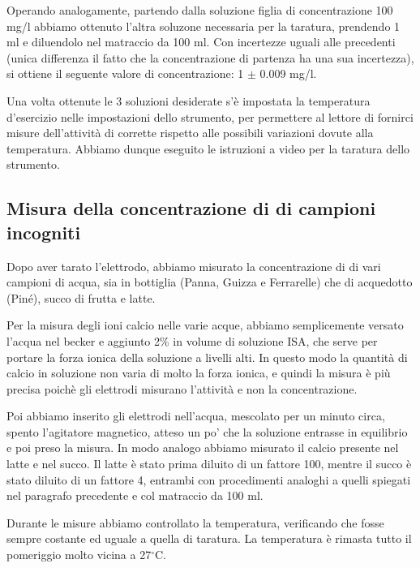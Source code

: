 Operando analogamente, partendo dalla soluzione figlia di concentrazione 100 mg/l abbiamo ottenuto l'altra soluzone
necessaria per la taratura, prendendo 1 ml e diluendolo nel matraccio da 100 ml. Con incertezze uguali alle precedenti (unica differenza il fatto che la concentrazione di partenza ha una sua incertezza), si ottiene il seguente
valore di concentrazione: 1 $\pm$ 0.009 mg/l.

Una volta ottenute le 3 soluzioni desiderate s'è impostata la temperatura d'esercizio nelle impostazioni
dello strumento, per permettere al lettore di fornirci misure dell'attività di 
corrette rispetto alle possibili variazioni dovute alla temperatura. Abbiamo dunque eseguito le istruzioni a video
per la taratura dello strumento.

\subsection*{Misura della concentrazione di  di campioni incogniti}

Dopo aver tarato l'elettrodo, abbiamo misurato la concentrazione di  di vari campioni di acqua,
sia in bottiglia (Panna, Guizza e Ferrarelle) che di acquedotto (Piné), succo di frutta e latte.

Per la misura degli ioni calcio nelle varie acque, abbiamo semplicemente versato l'acqua nel becker
e aggiunto 2\% in volume di soluzione ISA, che serve per portare la forza ionica della soluzione
a livelli alti. In questo modo la quantità di calcio in soluzione non varia di molto la forza ionica,
e quindi la misura è più precisa poichè gli elettrodi misurano l'attività e non la concentrazione.

Poi abbiamo inserito gli elettrodi nell'acqua, mescolato per un minuto circa, spento l'agitatore magnetico,
atteso un po' che la soluzione entrasse in equilibrio e poi preso la misura. In modo analogo abbiamo
misurato il calcio presente nel latte e nel succo. Il latte è stato prima diluito di un fattore 100,
mentre il succo è stato diluito di un fattore 4, entrambi con procedimenti analoghi a quelli spiegati nel paragrafo
precedente e col matraccio da 100 ml.

Durante le misure abbiamo controllato la temperatura, verificando che fosse sempre costante ed uguale a quella di taratura.
La temperatura è rimasta tutto il pomeriggio molto vicina a 27$^\circ$C.
